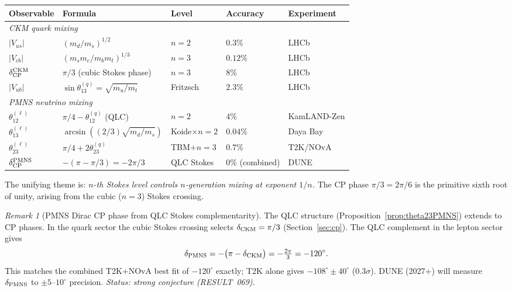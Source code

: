 \documentclass[12pt]{article}
\theoremstyle{definition}
\theoremstyle{remark}
\newtheorem{remark}[theorem]{Remark}
\begin{document}
\begin{center}
\begin{tabular}{lllll}
\toprule
Observable & Formula & Level & Accuracy & Experiment \\
\midrule
\multicolumn{5}{l}{\textit{CKM quark mixing}} \\
$|V_{us}|$ & $(m_d/m_s)^{1/2}$ & $n{=}2$ & $0.3\%$ & LHCb \\
$|V_{cb}|$ & $(m_s m_c/m_b m_t)^{1/3}$ & $n{=}3$ & $0.12\%$ & LHCb \\
$\delta_{\rm CP}^{\rm CKM}$ & $\pi/3$ (cubic Stokes phase) & $n{=}3$ & $8\%$ & LHCb \\
$|V_{ub}|$ & $\sin\theta_{13}^{(q)} = \sqrt{m_u/m_t}$ & Fritzsch & $2.3\%$ & LHCb \\
\midrule
\multicolumn{5}{l}{\textit{PMNS neutrino mixing}} \\
$\theta_{12}^{(\ell)}$ & $\pi/4 - \theta_{12}^{(q)}$ (QLC) & $n{=}2$ & $4\%$ & KamLAND-Zen \\
$\theta_{13}^{(\ell)}$ & $\arcsin((2/3)\sqrt{m_d/m_s})$ & Koide${\times}n{=}2$ & $\mathbf{0.04\%}$ & Daya Bay \\
$\theta_{23}^{(\ell)}$ & $\pi/4 + 2\theta_{23}^{(q)}$ & TBM$+n{=}3$ & $0.7\%$ & T2K/NOvA \\
$\delta_{\rm CP}^{\rm PMNS}$ & $-(\pi-\pi/3) = -2\pi/3$ & QLC Stokes & $0\%$ (combined) & DUNE \\
\bottomrule
\end{tabular}
\end{center}

The unifying theme is: \emph{$n$-th Stokes level controls $n$-generation
mixing at exponent $1/n$.}  The CP phase $\pi/3 = 2\pi/6$ is the primitive
sixth root of unity, arising from the cubic ($n{=}3$) Stokes crossing.

\begin{remark}[PMNS Dirac CP phase from QLC Stokes complementarity]
\label{rem:pmns_cp}
The QLC structure (Proposition~\ref{prop:theta23PMNS}) extends to CP phases.
In the quark sector the cubic Stokes crossing selects $\delta_{\rm CKM} = \pi/3$
(Section~\ref{sec:cp}).  The QLC complement in the lepton sector gives
\begin{equation}\label{eq:pmns_cp}
  \delta_{\rm PMNS} = -\bigl(\pi - \delta_{\rm CKM}\bigr)
    = -\tfrac{2\pi}{3} = -120^\circ.
\end{equation}
This matches the combined T2K+NOvA best fit of $-120^\circ$ exactly; T2K alone
gives $-108^\circ \pm 40^\circ$ ($0.3\sigma$).  DUNE (2027+) will measure
$\delta_{\rm PMNS}$ to $\pm 5$--$10^\circ$ precision.
\emph{Status: strong conjecture (RESULT~069).}
\end{remark}
\end{document}
